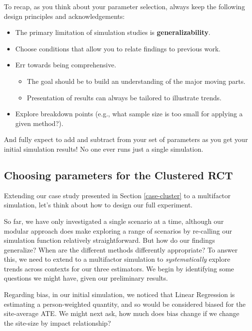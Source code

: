 \documentclass[
]{book}
\providecommand{\tightlist}{%
  \setlength{\itemsep}{0pt}\setlength{\parskip}{0pt}}
\begin{document}
To recap, as you think about your parameter selection, always keep the following design principles and acknowledgements:

\begin{itemize}
\tightlist
\item
  The primary limitation of simulation studies is \textbf{generalizability}.
\item
  Choose conditions that allow you to relate findings to previous work.
\item
  Err towards being comprehensive.

  \begin{itemize}
  \tightlist
  \item
    The goal should be to build an understanding of the major moving parts.
  \item
    Presentation of results can always be tailored to illustrate trends.
  \end{itemize}
\item
  Explore breakdown points (e.g., what sample size is too small for applying a given method?).
\end{itemize}

And fully expect to add and subtract from your set of parameters as you get your initial simulation results! No one ever runs just a single simulation.

\subsection{Choosing parameters for the Clustered RCT}\label{choosing-parameters-for-the-clustered-rct}

Extending our case study presented in Section \ref{case-cluster} to a multifactor simulation, let's think about how to design our full experiment.

So far, we have only investigated a single scenario at a time, although our modular approach does make exploring a range of scenarios by re-calling our simulation function relatively straightforward.
But how do our findings generalize? When are the different methods differently appropriate?
To answer this, we need to extend to a multifactor simulation to \emph{systematically} explore trends across contexts for our three estimators.
We begin by identifying some questions we might have, given our preliminary results.

Regarding bias, in our initial simulation, we noticed that Linear Regression is estimating a person-weighted quantity, and so would be considered biased for the site-average ATE.
We might next ask, how much does bias change if we change the site-size by impact relationship?
\end{document}
